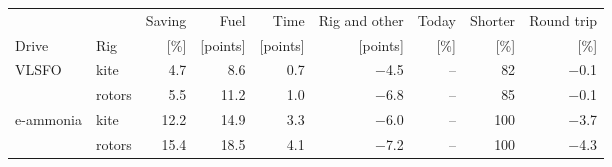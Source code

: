\begin{tabular}{@{}llrrrrrrr}
\toprule
 & & Saving & Fuel & Time & Rig and other & Today & Shorter & Round trip \\
Drive & Rig & [\%] & [points] & [points] & [points] & [\%] & [\%] & [\%] \\
\midrule
VLSFO & kite & \cellcolor{gain!12}4.7 & \cellcolor{gain!19}8.6 & \cellcolor{gain!7}0.7 & \cellcolor{loss!25}$-$4.5 & -- & 82 & \cellcolor{gain!1}$-$0.1 \\
 & rotors & \cellcolor{gain!14}5.5 & \cellcolor{gain!24}11.2 & \cellcolor{gain!10}1.0 & \cellcolor{loss!37}$-$6.8 & -- & 85 & \cellcolor{gain!1}$-$0.1 \\
e-ammonia & kite & \cellcolor{gain!32}12.2 & \cellcolor{gain!32}14.9 & \cellcolor{gain!32}3.3 & \cellcolor{loss!33}$-$6.0 & -- & 100 & \cellcolor{gain!35}$-$3.7 \\
 & rotors & \cellcolor{gain!40}15.4 & \cellcolor{gain!40}18.5 & \cellcolor{gain!40}4.1 & \cellcolor{loss!40}$-$7.2 & -- & 100 & \cellcolor{gain!40}$-$4.3 \\
\bottomrule
\end{tabular}
